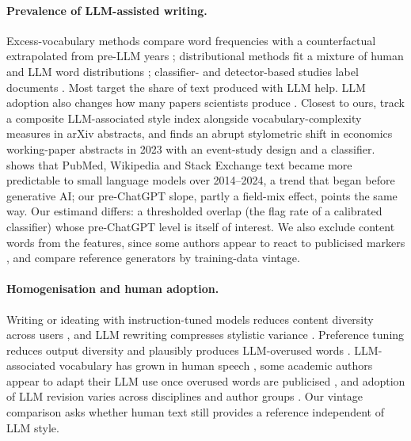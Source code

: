 \documentclass[11pt]{article}
\begin{document}
\paragraph{Prevalence of LLM-assisted writing.}
Excess-vocabulary methods compare word frequencies with a counterfactual extrapolated from pre-LLM years
\citep{kobak2025, holzwarth2026, lee2026}; distributional methods fit a mixture of human and LLM word
distributions \citep{liang2024monitoring, liang2024mapping, liang2025widespread, geng2024}; classifier- and
detector-based studies label documents \citep{lin2025, brooks2024, sun2025, khan2026}. Most target the share of text produced with LLM help. LLM adoption also changes how many papers scientists produce \citep{kusumegi2025}. Closest to ours, \citet{bentley2026} track a composite LLM-associated style index alongside
vocabulary-complexity measures in arXiv abstracts, and \citet{askitas2025} finds an abrupt stylometric shift in economics
working-paper abstracts in 2023 with an event-study design and a classifier. \citet{chang2026} shows that
PubMed, Wikipedia and Stack Exchange text became more predictable to small language models over 2014--2024, a
trend that began before generative AI; our pre-ChatGPT slope, partly a field-mix effect, points the same way. Our estimand differs: a thresholded overlap (the flag rate of a calibrated classifier) whose pre-ChatGPT level is itself of interest. We also exclude content words from the features, since some authors appear to react to publicised markers \citep{geng2025}, and compare reference generators by training-data vintage.

\paragraph{Homogenisation and human adoption.}
Writing or ideating with instruction-tuned models reduces content diversity across users \citep{padmakumar2024, doshi2024, anderson2024homog}, and LLM rewriting compresses stylistic variance \citep{sourati2025}. Preference tuning reduces output diversity \citep{kirk2024, wu2025monoculture} and plausibly produces LLM-overused words
\citep{juzek2025}. LLM-associated vocabulary has grown in human speech \citep{yakura2024, anderson2025spoken},
some academic authors appear to adapt their LLM use once overused words are publicised \citep{geng2025}, and adoption of LLM
revision varies across disciplines and author groups \citep{lin2025}. Our vintage comparison asks whether human text still provides a reference independent of LLM style.
\end{document}
